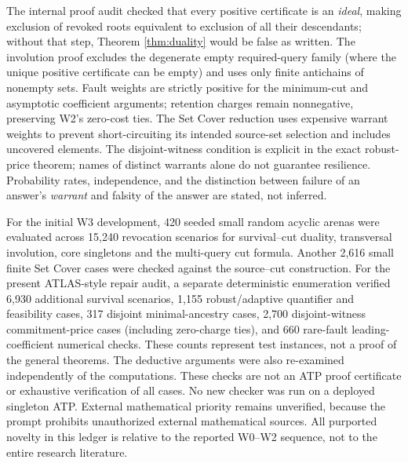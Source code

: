 \documentclass[11pt,letterpaper]{article}
\begin{document}
The internal proof audit checked that every positive certificate is an \emph{ideal}, making exclusion of revoked roots equivalent to exclusion of all their descendants; without that step, Theorem \ref{thm:duality} would be false as written. The involution proof excludes the degenerate empty required-query family (where the unique positive certificate can be empty) and uses only finite antichains of nonempty sets. Fault weights are strictly positive for the minimum-cut and asymptotic coefficient arguments; retention charges remain nonnegative, preserving W2's zero-cost ties. The Set Cover reduction uses expensive warrant weights to prevent short-circuiting its intended source-set selection and includes uncovered elements. The disjoint-witness condition is explicit in the exact robust-price theorem; names of distinct warrants alone do not guarantee resilience. Probability rates, independence, and the distinction between failure of an answer's \emph{warrant} and falsity of the answer are stated, not inferred.

For the initial W3 development, 420 seeded small random acyclic arenas were evaluated across 15,240 revocation scenarios for survival--cut duality, transversal involution, core singletons and the multi-query cut formula. Another 2,616 small finite Set Cover cases were checked against the source--cut construction. For the present ATLAS-style repair audit, a separate deterministic enumeration verified 6,930 additional survival scenarios, 1,155 robust/adaptive quantifier and feasibility cases, 317 disjoint minimal-ancestry cases, 2,700 disjoint-witness commitment-price cases (including zero-charge ties), and 660 rare-fault leading-coefficient numerical checks. These counts represent test instances, not a proof of the general theorems. The deductive arguments were also re-examined independently of the computations. These checks are not an ATP proof certificate or exhaustive verification of all cases. No new checker was run on a deployed singleton ATP. External mathematical priority remains unverified, because the prompt prohibits unauthorized external mathematical sources. All purported novelty in this ledger is relative to the reported W0--W2 sequence, not to the entire research literature.
\end{document}

